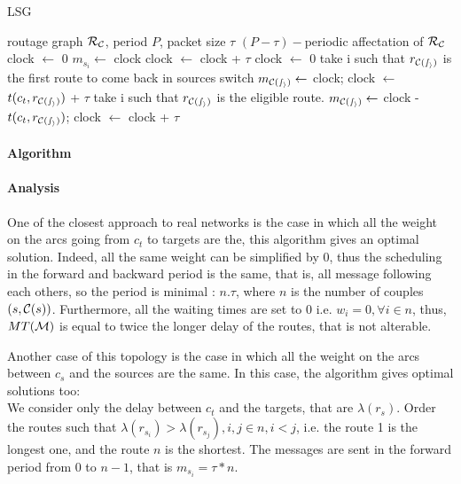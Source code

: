 \documentclass[a4paper,10pt]{article}
\begin{document}
\begin{algorithm}[H]
\caption{LSG}
\begin{algorithmic}
\REQUIRE routage graph ${\cal R_{\cal C}}$, period $P$, packet size $\tau$
\ENSURE $(P-\tau)-$periodic affectation of ${\cal R_{\cal C}}$
\STATE clock $\leftarrow$ 0
\STATE  $m_{s_i} \leftarrow$ clock
\STATE clock $\leftarrow$ clock + $\tau$
\ENDFOR
\STATE clock $\leftarrow$ 0
\STATE take i such that $r_{\cal C(s_i)}$ is the first route to come back in sources switch
\STATE $m_{\cal C(s_i)} \leftarrow $ clock;
\STATE clock $\leftarrow$ $t(c_t,r_{\cal C(s_i)})$ + $\tau$
\STATE take i such that $r_{\cal C(s_i)}$ is the eligible route.
\STATE $m_{\cal C(s_i)} \leftarrow $ clock - $t(c_t,r_{\cal C(s_i)})$;
\STATE clock $\leftarrow$ clock + $\tau$

\ENDWHILE

\end{algorithmic}
\end{algorithm}

	\paragraph{Algorithm}
	\paragraph{Analysis}
	
One of the closest approach to real networks is the case in which all the weight on the arcs going from $c_t$ to targets are the, this algorithm gives an optimal solution. Indeed, all the same weight can be simplified by 0, thus the scheduling in the forward and backward period is the same, that is, all message following each others, so the period is minimal : $n.\tau$, where $n$ is the number of couples $(s,{\cal C}(s))$. Furthermore, all the waiting times are set to 0 i.e. $w_i = 0,\forall i \in n$, thus, $MT({\cal M})$ is equal to twice the longer delay of the routes, that is not alterable.

Another case of this topology is the case in which all the weight on the arcs between $c_s$ and the sources are the same.
In this case, the algorithm gives optimal solutions too:\\

We consider only the delay between $c_t$ and the targets, that are $\lambda(r_{s})$. Order the routes such that $\lambda(r_{s_i}) > \lambda(r_{s_j}), i,j \in n, i<j$, i.e. the route 1 is the longest one, and the route $n$ is the shortest.
The messages are sent in the forward period from 0 to $n-1$, that is $m_{s_i} = \tau * n$.
\end{document}
